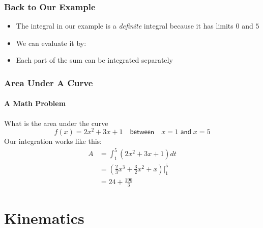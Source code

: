 \documentclass[12pt,compress,aspectratio=169]{beamer}
\begin{document}
\begin{frame}
  \frametitle{Back to Our Example}
  \begin{itemize}
  \item The integral in our example is a \emph{definite} integral because it
    has limits $0$ and $5$
  \item We can evaluate it by:
    
  \item Each part of the sum can be integrated separately
  \end{itemize}
\end{frame}



\begin{frame}
  \frametitle{Area Under A Curve}
  \framesubtitle{A Math Problem}
  What is the area under the curve
  \begin{displaymath}
    f(x)=2x^2+3x+1\quad\textsf{between}\quad x=1\;\textsf{and}\;x=5
  \end{displaymath}
  Our integration works like this:
  \begin{align*}
    A&=\int_1^5\left(2x^2+3x+1\right)dt\\
    &=\left(\frac{2}{3}x^3+\frac{3}{2}x^2+x\right)\Big|^5_1\\
    &=24+\frac{196}{3}
  \end{align*}
\end{frame}

\section{Kinematics}
\end{document}
